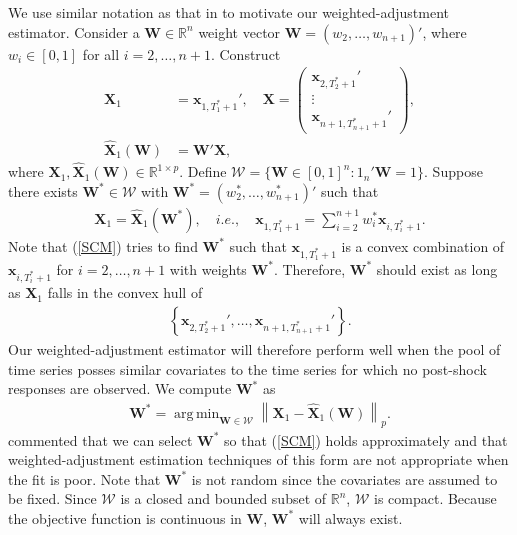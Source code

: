 \documentclass[11pt,3p,review,authoryear]{elsarticle}
\newcommand{\R}{\mathbb{R}}
\def\mbf#1{\mathbf{#1}} %
\newcommand{\reals}{\mathbb{R}} %
\def\mc#1{\mathcal{#1}} %
\DeclareMathOperator*{\argmin}{arg\,min} %
\newcommand{\norm}[1]{\left\lVert#1\right\rVert} %
\theoremstyle{definition}
\begin{document}
We use similar notation as that in \cite{abadie2010synthetic} to motivate our weighted-adjustment estimator. Consider a $\mbf{W} \in \R^n$ weight vector 
$\mbf{W}=(w_2, \ldots, w_{n+1})'$, where $w_i\in [0,1]$ for all 
$i = 2, \ldots, n+1$. Construct
\begin{align*}
 \mbf{X}_1 &= \mbf{x}_{1, T_1^*+1}',
  \quad  
  \mbf{X} = \begin{pmatrix}
    \mbf{x}_{2, T_2^*+1}' \\
    \vdots \\
    \mbf{x}_{n+1, T_{n+1}^*+1}'
  \end{pmatrix}, \\ 
  \hat{\mbf{X}}_1(\mbf{W}) 
   & = \mbf{W}'\mbf{X},
\end{align*}
where $\mbf{X}_1,\hat{\mbf{X}}_1(\mbf{W}) \in \R^{1 \times p}$. Define $\mc{W}=\{\mbf{W}\in [0,1]^n \colon 1_n'\mbf{W} = 1 \}$. 
Suppose there exists $\mbf{W}^*\in \mc{W}$ with 
$\mbf{W}^*=(w_2^*, \ldots, w_{n+1}^*)'$ such that
\begin{align}
 \mbf{X}_1=\hat{\mbf{X}}_1(\mbf{W}^*),  \quad i.e., \quad \mbf{x}_{1, T_1^*+1} = \sum_{i=2}^{n+1} w_i^*\mbf{x}_{i, T_i^*+1}.\label{SCM}
\end{align}
Note that (\ref{SCM}) tries to find $\mbf{W}^*$ such that $\mbf{x}_{1, T_1^*+1}$ is a convex combination of $\mbf{x}_{i, T_i^*+1}$ for $i = 2, \ldots, n+1$ with weights $\mbf{W}^*$. Therefore, $\mbf{W}^*$ should exist as long as $\mbf{X}_1$ falls in the convex hull of 
 \begin{align*}
   \left\{ \mbf{x}_{2, T_2^*+1}', \ldots, \mbf{x}_{n+1, T_{n+1}^*+1}' \right\}.
 \end{align*}
Our weighted-adjustment estimator will therefore perform well when the pool of time series posses similar covariates to the time series for which no post-shock responses are observed. We compute $\mbf{W}^*$ as
\begin{align}
  \mbf{W}^* = \argmin_{\mbf{W}\in \mc{W}} \norm{\mbf{X}_1-\hat{\mbf{X}}_1(\mbf{W})}_{p}. 
  \label{W}
\end{align}
\cite{abadie2010synthetic} commented that we can select $\mbf{W}^*$ 
so that (\ref{SCM}) holds approximately 
and that weighted-adjustment estimation techniques of this form are not 
appropriate when the fit is poor. 
Note that $\mbf{W}^*$ is not random since the covariates are assumed to be fixed. Since $\mc{W}$ is a closed and bounded subset of $\reals^n$,  $\mc{W}$ is compact. Because the objective function 
is continuous in $\mbf{W}$, $\mbf{W}^*$ will always exist.
\end{document}
